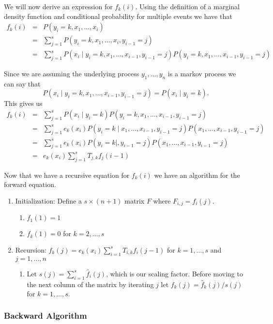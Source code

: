 \documentclass{article}
\numberwithin{equation}{section}
\renewcommand{\P}{P}
\begin{document}
We will now derive an expression for $f_k(i)$.  Using the definition
of a marginal density function and conditional probability for
multiple events we have that
\begin{eqnarray*}
f_k(i) &=& \P(y_i=k,x_1,\ldots,x_i) \\
&=& \sum_{j=1}^s \P(y_i=k,x_1,\ldots,x_i,y_{i-1}=j) \\
&=& \sum_{j=1}^s \P(x_i\mid
y_i=k,x_1,\ldots,x_{i-1},y_{i-1}=j)\P(y_i=k,x_1,\ldots,x_{i-1},y_{i-1}=j)
\end{eqnarray*}

Since we are assuming the underlying process $y_1,\ldots,y_n$ is a
markov process we can say that
\[
\P(x_i\mid y_i=k,x_1,\ldots,x_{i-1},y_{i-1}=j)=\P(x_i\mid y_i=k).
\]
This gives us
\begin{eqnarray*}
f_k(i) &=& \sum_{j=1}^s \P(x_i\mid
y_i=k)\P(y_i=k,x_1,\ldots,x_{i-1},y_{i-1}=j) \\
&=& \sum_{j=1}^s e_k(x_i)\P(y_i=k\mid
x_1,\ldots,x_{i-1},y_{i-1}=j)\P(x_1,\ldots,x_{i-1},y_{i-1}=j) \\
&=& \sum_{j=1}^s e_k(x_i)\P(y_i=k\mid
,y_{i-1}=j)\P(x_1,\ldots,x_{i-1},y_{i-1}=j) \\
&=& e_k(x_i)\sum_{j=1}^s T_{j,k} f_j(i-1)
\end{eqnarray*}

Now that we have a recursive equation for $f_k(i)$ we have an
algorithm for the forward equation.
\begin{enumerate}
\item Initialization: Define a $s\times(n+1)$ matrix $F$ where
$F_{i,j}=f_i(j)$.
    \begin{enumerate}
    \item $f_1(1)=1$
    \item $f_k(1)=0$ for $k=2,\ldots,s$
    \end{enumerate}
\item Recursion: $\hat{f}_k(j)=e_k(x_i)\sum_{i=1}^s T_{i,k}f_i(j-1)$
for $k=1,\ldots,s$ and $j=1,\ldots,n$
    \begin{enumerate}
    \item Let $s(j)=\sum_{i=1}^s \hat{f}_i(j)$, which is our scaling
    factor.  Before moving to the next column of the matrix by
    iterating $j$ let $f_k(j)=\hat{f}_k(j)/s(j)$ for $k=1,\ldots,s$.
    \end{enumerate}
\end{enumerate}

\subsubsection{Backward Algorithm}
\end{document}
